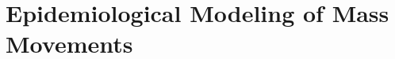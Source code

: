 
\chapter{Epidemiological Modeling of Mass Movements}
\label{ch:rumor}

\begingroup
\newcommand{\score}{S}
\newcommand{\myalgo}{CoolAlgo}

%


%







\endgroup
